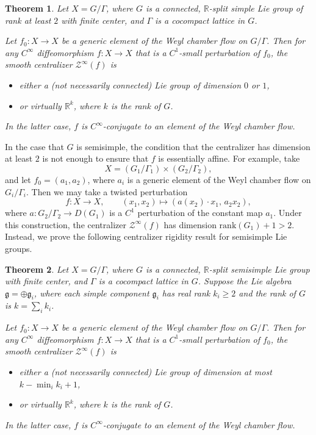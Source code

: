 \documentclass[11pt]{amsart}
\numberwithin{equation}{section}
\newcommand{\R}{\mathbb{R}}
\theoremstyle{plain}
\newtheorem{thm}{Theorem}[section]
\begin{document}
\begin{thm}\label{cenrig}
Let $X=G/\Gamma$, where $G$ is a connected, $\R$-split simple Lie group of rank at least $2$ with finite center, and $\Gamma$ is a cocompact lattice in $G$.

Let $f_0: X\to X$ be a generic element of the Weyl chamber flow on $G/\Gamma$. Then for any $C^\infty$ diffeomorphism $f:X\to X$ that is a $C^1$-small perturbation of $f_0$, the smooth centralizer $\mathcal{Z}^\infty(f)$ is
\begin{itemize}
 \item either a (not necessarily connected) Lie group of dimension $0$ or $1$,
 \item or virtually $\R^k$, where $k$ is the rank of $G$.
\end{itemize}
In the latter case, $f$ is $C^\infty$-conjugate to an element of the Weyl chamber flow.


\end{thm}


In the case that $G$ is semisimple, the condition that the centralizer has dimension at least $2$ is not enough to ensure that $f$ is essentially affine. For example, take
\[
X=(G_1/\Gamma_1)\times (G_2/\Gamma_2),
\]
and let $f_0=(a_1,a_2)$, where $a_i$ is a generic element of the Weyl chamber flow on $G_i/\Gamma_i$. Then we may take a twisted perturbation
\[
f: X\to X,\qquad (x_1,x_2)\mapsto (a(x_2)\cdot x_1,\, a_2 x_2),
\]
where $a:G_2/\Gamma_2\to D(G_1)$ is a $C^1$ perturbation of the constant map $a_1$. Under this construction, the centralizer $\mathcal{Z}^\infty(f)$ has dimension $\mathrm{rank}(G_1)+1>2$. Instead, we prove the following centralizer rigidity result for semisimple Lie groups.

\begin{thm}\label{cenrigsemi}
Let $X=G/\Gamma$, where $G$ is a connected, $\R$-split semisimple Lie group with finite center, and $\Gamma$ is a cocompact lattice in $G$. Suppose the Lie algebra $\mathfrak{g}=\oplus \mathfrak g_i$, where each simple component $\mathfrak g_i$ has real rank $k_i\ge 2$
and the rank of $G$ is $k=\sum_i k_i$.

Let $f_0: X\to X$ be a generic element of the Weyl chamber flow on $G/\Gamma$. Then for any $C^\infty$ diffeomorphism $f:X\to X$ that is a $C^1$-small perturbation of $f_0$, the smooth centralizer $\mathcal{Z}^\infty(f)$ is
\begin{itemize}
 \item either a (not necessarily connected) Lie group of dimension at most $k-\min_ik_i+1$,
 \item or virtually $\R^k$, where $k$ is the rank of $G$.
\end{itemize}
In the latter case, $f$ is $C^\infty$-conjugate to an element of the Weyl chamber flow.
\end{thm}
\end{document}
